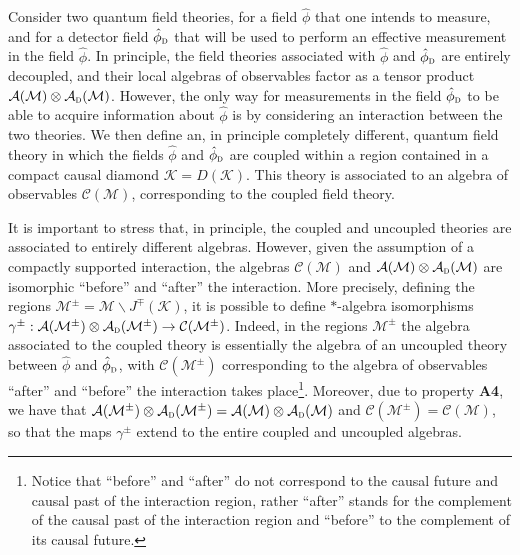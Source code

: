 \documentclass[letterpaper,12pt,titlepage,oneside,final]{book}
\newcommand{\M}{\mathcal{M}}
\newcommand{\tc}[1]{\textsc{#1}}
\begin{document}
Consider two quantum field theories, for a field $\hat{\phi}$ that one intends to measure, and for a detector field $\hat{\phi}_\tc{d}$ that will be used to perform an effective measurement in the field $\hat{\phi}$. In principle, the field theories associated with $\hat{\phi}$ and $\hat{\phi}_\tc{d}$ are entirely decoupled, and their local algebras of observables factor as a tensor product $\mathcal{A}(\M)\otimes\mathcal{A}_\tc{d}(\M)$. However, the only way for measurements in the field $\hat{\phi}_\tc{d}$ to be able to acquire information about $\hat{\phi}$ is by considering an interaction between the two theories. We then define an, in principle completely different, quantum field theory in which the fields $\hat{\phi}$ and $\hat{\phi}_\tc{d}$ are coupled within a region contained in a compact causal diamond $\mathcal{K} = D(\mathcal{K})$. This theory is associated to an algebra of observables $\mathcal{C}(\M)$, corresponding to the coupled field theory. 

It is important to stress that, in principle, the coupled and uncoupled theories are associated to entirely different algebras. However, given the assumption of a compactly supported interaction, the algebras $\mathcal{C}(\M)$ and $\mathcal{A}(\M)\otimes \mathcal{A}_\tc{d}(\M)$ are isomorphic ``before'' and ``after'' the interaction. More precisely, defining the regions $\M^\pm = \M\backslash J^{\mp}(\mathcal{K})$, it is possible to define $\ast$-algebra isomorphisms $\gamma^\pm:\mathcal{A}(\M^\pm)\otimes \mathcal{A}_\tc{d}(\M^\pm)\rightarrow \mathcal{C}(\M^\pm)$. Indeed, in the regions $\M^\pm$ the algebra associated to the coupled theory is essentially the algebra of an uncoupled theory between $\hat{\phi}$ and $\hat{\phi}_\tc{d}$, with $\mathcal{C}(\M^\pm)$ corresponding to the algebra of observables ``after'' and ``before'' the interaction takes place\footnote{Notice that ``before'' and ``after'' do not correspond to the causal future and causal past of the interaction region, rather ``after'' stands for the complement of the causal past of the interaction region and ``before'' to the complement of its causal future.}. Moreover, due to property \textbf{A4}, we have that $\mathcal{A}(\M^\pm)\otimes \mathcal{A}_\tc{d}(\M^\pm) = \mathcal{A}(\M)\otimes \mathcal{A}_\tc{d}(\M)$ and $\mathcal{C}(\M^\pm) = \mathcal{C}(\M)$, so that the maps $\gamma^\pm$ extend to the entire coupled and uncoupled algebras. 
\end{document}
